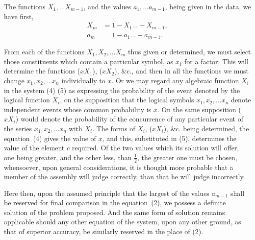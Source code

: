 \documentclass[oneside]{book}
\begin{document}
The functions $X_1,\dotsc X_{m-1}$, and the values
$a_1,\dotsc a_{m-1}$, being
given in the data, we have first,
\begin{align*}
  X_m &= 1 - X_1 \dotsc - X_{m-1},   \\
  a_m &= 1 - a_1 \dotsc - a_{m-1}.
\end{align*}

From each of the functions $X_1, X_2,\dotsc X_m$ thus given or determined,
we must select those constituents which contain a particular symbol, as
$x_1$ for a factor. This will determine the functions ($x X_1$), ($x X_2$),
\&c., and then in all the functions we must
change $x_1, x_2,\dotsc x_n$ individually to $x$. Or we may regard any
algebraic function $X_i$ in the system (4) (5) as expressing the
probability of the event denoted by the logical function $X_i$, on
the supposition that the logical symbols $x_1, x_2,\dotsc x_n$ denote
independent events whose common probability is $x$. On the same
supposition ($xX_i$) would denote the probability of the concurrence
of any particular event of the series $x_1, x_2,\dotsc x_n$ with $X_i$.
The forms of $X_i$, ($xX_i$), \&c. being determined, the equation~(4)
gives the value of $x$, and this, substituted in (5), determines the
value of the element $c$ required. Of the two values which its solution
will offer, one being greater, and the other less, than $\tfrac{1}{2}$, the
greater one must be chosen, whensoever, upon general considerations, it is
thought more probable that a member of the assembly
will judge correctly, than that he will judge incorrectly.

Here then, upon the assumed principle that the largest of
the values $a_{m-1}$ shall be reserved for final comparison in the
equation~(2), we possess a definite solution of the problem proposed. And
the same form of solution remains applicable should
any other equation of the system, upon any other ground, as that
of superior accuracy, be similarly reserved in the place of (2).
\end{document}

